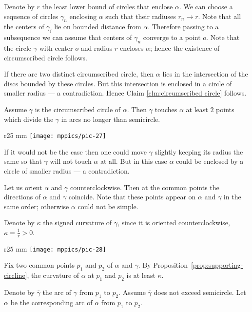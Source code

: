 Denote by $r$ the least lower bound of circles that enclose $\alpha$.
We can choose a sequence of circles $\gamma_n$ enclosing $\alpha$ such that their radiuses $r_n\to r$.
Note that all the centers of $\gamma_i$ lie on bounded distance from $\alpha$.
Therefore passing to a subsequence we can assume that centers of $\gamma_n$ converge to a point $o$.
Note that the circle $\gamma$ with center $o$ and radius $r$ encloses $\alpha$;
hence the existence of circumscribed circle follows.

If there are two distinct circumscribed circle, then $\alpha$ lies in the intersection of the discs bounded by these circles.
But this intersection is enclosed in a circle of smaller radius --- a contradiction.
Hence Claim \ref{clm:circumscribed circle} follows.

\begin{clm}{}
Assume $\gamma$ is the circumscribed circle of $\alpha$.
Then $\gamma$ touches $\alpha$ at least $2$ points which divide the $\gamma$ in arcs no longer than semicircle.
\end{clm}

\begin{wrapfigure}{r}{25 mm}
\vskip-4mm
\centering
\texttt{[image: mppics/pic-27]}
\vskip0mm
\end{wrapfigure}

If it would not be the case then one could move $\gamma$ slightly keeping its radius the same so that $\gamma$ will not touch $\alpha$ at all.
But in this case $\alpha$ could be enclosed by a circle of smaller radius --- a contradiction.

Let us orient $\alpha$ and $\gamma$ counterclockwise.
Then at the common points the directions of $\alpha$ and $\gamma$ coincide.
Note that these points appear on $\alpha$ and $\gamma$ in the same order;
otherwise $\alpha$ could not be simple.

Denote by $\kappa$ the signed curvature of $\gamma$, since it is oriented counterclockwise,
$\kappa=\tfrac1r>0$.

\begin{wrapfigure}{r}{25 mm}
\vskip-4mm
\centering
\texttt{[image: mppics/pic-28]}
\vskip0mm
\end{wrapfigure}

Fix two common points $p_1$ and $p_2$ of $\alpha$ and $\gamma$.
By Proposition~\ref{prop:supporting-circline}, the curvature of $\alpha$ at $p_1$ and $p_2$ is at least $\kappa$.

Denote by $\bar \gamma$ the arc of $\gamma$ from $p_1$ to $p_2$.
Assume $\bar\gamma$ does not exceed semicircle.
Let $\bar\alpha$ be the corresponding arc of $\alpha$  from $p_1$ to $p_2$.

